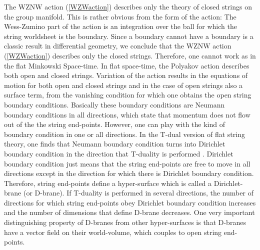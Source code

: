 \documentclass[a4paper,12pt]{article}
\begin{document}
The WZNW action (\ref{WZWaction}) describes only the theory of closed
strings on the group manifold. This is rather obvious from the form of the
action: The Wess-Zumino part of the action is an integration over the ball \coordHE{} for which the string worldsheet \coordHE{} is the boundary. Since a boundary
cannot have a boundary is a classic result in differential geometry, we
conclude that the WZNW action (\ref{WZWaction}) describes only the closed
strings. Therefore, one cannot work as in the flat Minkowski Space-time. In
flat space-time, the Polyakov action describes both open and closed strings.
Variation of the action results in the equations of motion for both open and
closed strings and in the case of open strings also a surface term, from the
vanishing condition for which one obtains the open string boundary
conditions. Basically these boundary conditions are Neumann boundary
conditions in all directions, which state that momentum does not flow out of
the the string end-points. However, one can play with the kind of boundary
condition in one or all directions. In the T-dual version of flat string
theory, one finds that Neumann boundary condition turns into Dirichlet
boundary condition in the direction that T-duality is performed \cite{TASI}.
Dirichlet boundary condition just means that the string end-points are free
to move in all directions except in the direction for which there is
Dirichlet boundary condition. Therefore, string end-points define a
hyper-surface which is called a Dirichlet-brane (or D-brane). If T-duality
is performed in several directions, the number of directions for which
string end-points obey Dirichlet boundary condition increases and the number
of dimensions that define D-brane decreases. One very important
distinguishing property of D-branes from other hyper-surfaces is that
D-branes have a vector field on their world-volume, which couples to open
string end-points.
\end{document}
